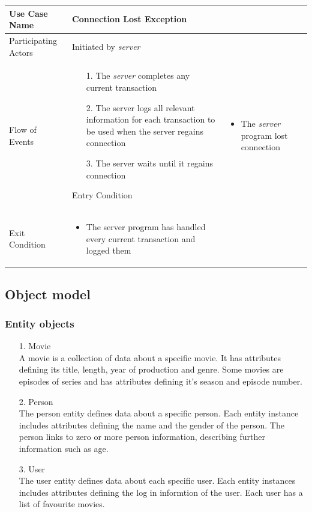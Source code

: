 \begin{center}
	\begin{tabular}{ | l | p{10cm} |  }
		 \hline
		Use Case Name & Connection Lost Exception \\ \hline
		Participating Actors & Initiated by \emph{server} \\ \hline
		Flow of Events & \begin{enumerate}
						\item[1.] The \emph{server} completes any current transaction
						\item[2.] The server logs all relevant information for each transaction to be used when the server regains connection
						\item[3.] The server waits until it regains connection
						\end{enumerate}
		Entry Condition & \begin{itemize}
						\item The \emph{server} program lost connection
					\end{itemize} \\ \hline
		Exit Condition & \begin{itemize}
						\item The server program has handled every current transaction and logged them
					\end{itemize} \\
		\hline
	\end{tabular}
\end{center}

\subsection{Object model}

\subsubsection{Entity objects}

\begin{enumerate}
	\item[1.] Movie \hfill \\
	A movie is a collection of data about a specific movie. It has attributes defining its title, length, year of production and genre. Some movies are episodes of series and has attributes defining it's season and episode number.
	
	\item[2.] Person \hfill \\
	The person entity defines data about a specific person. Each entity instance includes attributes defining the name and the gender of the person. The person links to zero or more person information, describing further information such as age.
	
	\item[3.] User \hfill \\
	The user entity defines data about each specific user. Each entity instances includes attributes defining the log in informtion of the user. Each user has a list of favourite movies.
	
\end{enumerate}

